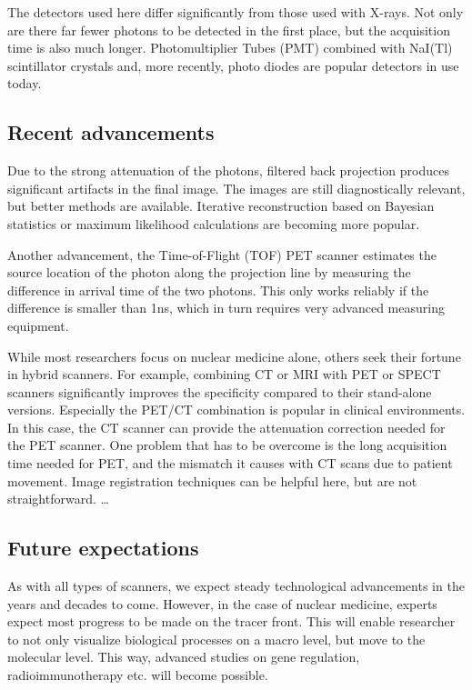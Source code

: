 The detectors used here differ significantly from those used with X-rays. Not
only are there far fewer photons to be detected in the first place, but the
acquisition time is also much longer. Photomultiplier Tubes (PMT) combined with
NaI(Tl) scintillator crystals and, more recently, photo diodes are
popular detectors in use today.

\subsection{Recent advancements}
Due to the strong attenuation of the photons, filtered back projection produces
significant artifacts in the final image. The images are still diagnostically
relevant, but better methods are available. Iterative reconstruction based on
Bayesian statistics or maximum likelihood calculations are becoming more
popular.

Another advancement, the Time-of-Flight (TOF) PET scanner estimates the
source location of the photon along the projection line by measuring the
difference in arrival time of the two photons. This only works reliably if the
difference is smaller than 1ns, which in turn requires very advanced measuring
equipment.

While most researchers focus on nuclear medicine alone, others seek their
fortune in hybrid scanners. For example, combining CT or MRI with PET or SPECT
scanners significantly improves the specificity compared to their stand-alone
versions. Especially the PET/CT combination is popular in clinical environments.
In this case, the CT scanner can provide the attenuation correction needed for
the PET scanner. One problem that has to be overcome is the long acquisition
time needed for PET, and the mismatch it causes with CT scans due to patient
movement. Image registration techniques can be helpful here, but are not
straightforward.
\ldots

\subsection{Future expectations}
As with all types of scanners, we expect steady technological advancements in
the years and decades to come. However, in the case of nuclear medicine, experts
expect most progress to be made on the tracer front. This will enable researcher
to not only visualize biological processes on a macro level, but move to the
molecular level. This way, advanced studies on gene regulation,
radioimmunotherapy etc. will become possible.


